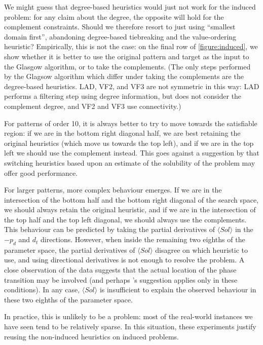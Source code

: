 \documentclass[twoside,11pt]{article}
\newcommand{\citet}[1]{\citeA{#1}}
\begin{document}
We might guess that degree-based heuristics would just not work for the induced problem: for any
claim about the degree, the opposite will hold for the complement constraints. Should we therefore
resort to just using ``smallest domain first'', abandoning degree-based tiebreaking and the
value-ordering heuristic? Empirically, this is not the case: on the final row of
\cref{figure:induced}, we show whether it is better to use the original pattern and target as the
input to the Glasgow algorithm, or to take the complements.  (The only steps performed by the
Glagsow algorithm which differ under taking the complements are the degree-based heuristics.  LAD,
VF2, and VF3 are not symmetric in this way: LAD performs a filtering step using degree information,
but does not consider the complement degree, and VF2 and VF3 use connectivity.)

For patterns of order 10, it is always better to try to move towards the satisfiable region: if we
are in the bottom right diagonal half, we are best retaining the original heuristics (which move us
towards the top left), and if we are in the top left we should use the complement instead. This
goes against a suggestion by \citet{DBLP:conf/aaai/Walsh98} that switching heuristics based upon an estimate of
the solubility of the problem may offer good performance.

For larger patterns, more complex behaviour emerges. If we are in the intersection of the bottom half
and the bottom right diagonal of the search space, we should always retain the original heuristic,
and if we are in the intersection of the top half and the top left diagonal, we should always use
the complements. This behaviour can be predicted by taking the partial derivatives of $\langle Sol
\rangle$ in the $-p_d$ and $d_t$ directions.  However, when inside the remaining two eighths of the
parameter space, the partial derivatives of $\langle Sol \rangle$ disagree on which heuristic to
use, and using directional derivatives is not enough to resolve the problem. A close observation of
the data suggests that the actual location of the phase transition may be involved (and perhaps
\citeauthor{DBLP:conf/aaai/Walsh98}'s suggestion applies only in these conditions). In any case, $\langle Sol
\rangle$ is insufficient to explain the observed behaviour in these two eighths of the parameter space.

In practice, this is unlikely to be a problem: most of the real-world instances we have seen tend to
be relatively sparse. In this situation, these experiments justify reusing the non-induced
heuristics on induced problems.
\end{document}
